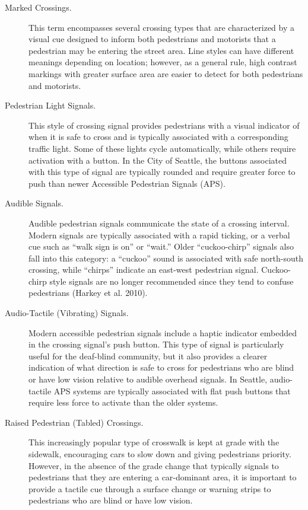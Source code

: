 \begin{description}
\item[Marked Crossings.]
This term encompasses several crossing types that are characterized by a visual cue designed to inform both pedestrians and motorists that a pedestrian may be entering the street area.  Line styles can have different meanings depending on location; however, as a general rule, high contrast markings with greater surface area are easier to detect for both pedestrians and motorists. 

\item[Pedestrian Light Signals.]
This style of crossing signal provides pedestrians with a visual indicator of when it is safe to cross and is typically associated with a corresponding traffic light.  Some of these lights cycle automatically, while others require activation with a button.  In the City of Seattle, the buttons associated with this type of signal are typically rounded and require greater force to push than newer Accessible Pedestrian Signals (APS).

\item[Audible Signals.]
Audible pedestrian signals communicate the state of a crossing interval.  Modern signals are typically associated with a rapid ticking, or a verbal cue such as “walk sign is on” or “wait.”  Older “cuckoo-chirp” signals also fall into this category: a “cuckoo” sound is associated with safe north-south crossing, while “chirps” indicate an east-west pedestrian signal. Cuckoo-chirp style signals are no longer recommended since they tend to confuse pedestrians (Harkey et al. 2010).   

\item[Audio-Tactile (Vibrating) Signals.]
Modern accessible pedestrian signals include a haptic indicator embedded in the crossing signal's push button.  This type of signal is particularly useful for the deaf-blind community, but it also provides a clearer indication of what direction is safe to cross for pedestrians who are blind or have low vision relative to audible overhead signals.  In Seattle, audio-tactile APS systems are typically associated with flat push buttons that require less force to activate than the older systems.

\item[Raised Pedestrian (Tabled) Crossings.]
This increasingly popular type of crosswalk is kept at grade with the sidewalk, encouraging cars to slow down and giving pedestrians priority.  However, in the absence of the grade change that typically signals to pedestrians that they are entering a car-dominant area, it is important to provide a tactile cue through a surface change or warning strips to pedestrians who are blind or have low vision. 


\end{description}
